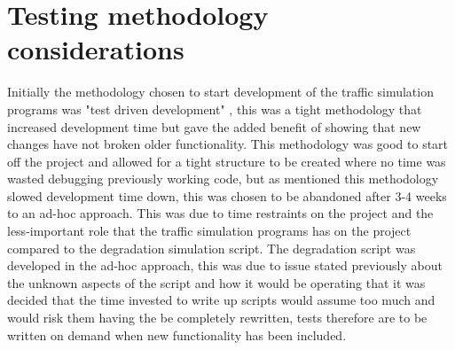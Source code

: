 \section{Testing methodology considerations}
Initially the methodology chosen to start development of the traffic simulation programs was "test driven development" \citep{beck2003test}, this was a tight methodology that increased development time but gave the added benefit of showing that new changes have not broken older functionality. This methodology was good to start off the project and allowed for a tight structure to be created where no time was wasted debugging previously working code, but as mentioned this methodology slowed development time down, this was chosen to be abandoned after 3-4 weeks to an ad-hoc approach. This was due to time restraints on the project and the less-important role that the traffic simulation programs has on the project compared to the degradation simulation script. The degradation script was developed in the ad-hoc approach, this was due to issue stated previously about the unknown aspects of the script and how it would be operating that it was decided that the time invested to write up scripts would assume too much and would risk them having the be completely rewritten, tests therefore are to be written on demand when new functionality has been included.


%
%
%
